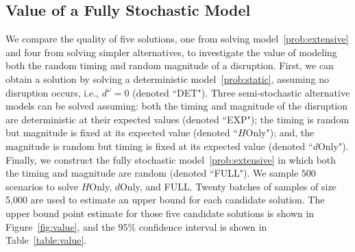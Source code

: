 \documentclass[11pt]{article}
\newcommand{\tcr}{\textcolor{red}}
\newcommand{\tcb}{\textcolor{blue}}
\begin{document}
	\subsection{Value of a Fully Stochastic Model} \label{subsec:value}
	We compare the quality of five solutions, one from solving model~\eqref{prob:extensive} and four from solving simpler alternatives, to investigate the value of modeling both the random timing and random magnitude of a disruption. First, we can obtain a solution by solving a deterministic model~\eqref{prob:static}, assuming no disruption occurs, i.e., $d^\omega=0$ (denoted ``DET"). Three semi-stochastic alternative models can be solved assuming: both the timing and magnitude of the disruption are deterministic at their expected values (denoted ``EXP"); the timing is random but magnitude is fixed at its expected value (denoted ``\(H\)Only"); and, the magnitude is random but timing is fixed at its expected value (denoted ``\(d\)Only"). Finally, we construct the fully stochastic model~\eqref{prob:extensive} in which both the timing and magnitude are random (denoted ``FULL"). We sample \(500\) scenarios to solve \(H\)Only, \(d\)Only, and FULL. Twenty batches of samples of size 5,000 are used to estimate an upper bound for each candidate solution. The upper bound point estimate for those five candidate solutions is shown in Figure~\ref{fig:value}, and the \(95\%\) confidence interval is shown in Table~\ref{table:value}. 
	
\end{document}
